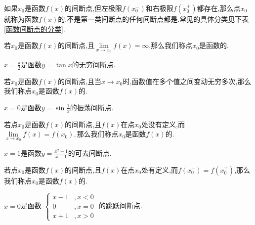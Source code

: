 如果$x_0$是函数$f(x)$的间断点,但左极限$f(x_0^-)$和右极限$f(x_0^+)$都存在,那么点$x_0$就称为函数$f(x)$的,不是第一类间断点的任何间断点都是.常见的具体分类见下表\ref{函数间断点的分类}.
\begin{table}[!htb]
	\centering
	\renewcommand{\arraystretch}{1}
	\caption{函数间断点的分类}
	\renewcommand{\arraystretch}{1}
	\label{函数间断点的分类}
\end{table} 
\vspace*{-3em}

若$x_0$是函数$f(x)$的间断点,且$\lim\limits_{x \to x_0}f(x)=\infty $,那么我们称点$x_0$是函数的.\jg

\simpleexamples $\displaystyle x=\frac{\pi}{2}$是函数$y=\tan x$的无穷间断点.

若$x_0$是函数$f(x)$的间断点,且当$x \to x_0$时,函数值在多个值之间变动无穷多次,那么我们称点$x_0$是函数$f(x)$的.\jg

\simpleexamples $\displaystyle x = 0$是函数$\displaystyle y =\sin\frac{1}{x}$的振荡间断点.
\vspace*{-1em}

若点$x_0$是函数$f(x)$的间断点,且$f(x)$在点$x_0$处没有定义,而$\lim\limits_{x \to x_0}f(x)=f(x_0),$那么我们称点$x_0$是函数$f(x)$的.\jg

\simpleexamples $\displaystyle x=1$是函数$\displaystyle y=\frac{x^2-1}{x-1}$的可去间断点.

若点$x_0$是函数$f(x)$的间断点,且$f(x)$在点$x_0$处有定义,而$f(x_0^-)=f(x_0^+)$,那么我们称点$x_0$是函数$f(x)$的.

\simpleexamples $\displaystyle x=0$是函数
$
\displaystyle
\begin{cases}
	x-1&,x<0\\
	0&,x=0\\
	x+1&,x>0
\end{cases}
$
的跳跃间断点.

